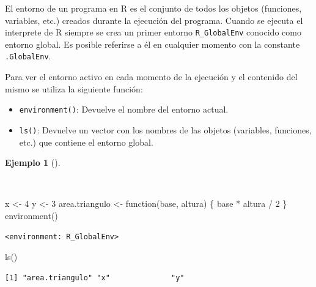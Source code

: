 \documentclass[
  a4paper,
]{scrreport}
\newenvironment{Shaded}{\begin{snugshade}}{\end{snugshade}}
\newcommand{\ControlFlowTok}[1]{\textcolor[rgb]{0.00,0.23,0.31}{#1}}
\newcommand{\DecValTok}[1]{\textcolor[rgb]{0.68,0.00,0.00}{#1}}
\newcommand{\FunctionTok}[1]{\textcolor[rgb]{0.28,0.35,0.67}{#1}}
\newcommand{\NormalTok}[1]{\textcolor[rgb]{0.00,0.23,0.31}{#1}}
\newcommand{\OtherTok}[1]{\textcolor[rgb]{0.00,0.23,0.31}{#1}}
\newcommand{\SpecialCharTok}[1]{\textcolor[rgb]{0.37,0.37,0.37}{#1}}
\providecommand{\tightlist}{%
  \setlength{\itemsep}{0pt}\setlength{\parskip}{0pt}}\usepackage{longtable,booktabs,array}
\theoremstyle{definition}
\theoremstyle{definition}
\newtheorem{example}{Ejemplo}[chapter]
\theoremstyle{remark}
\begin{document}
El entorno de un programa en R es el conjunto de todos los objetos
(funciones, variables, etc.) creados durante la ejecución del programa.
Cuando se ejecuta el interprete de R siempre se crea un primer entorno
\texttt{R\_GlobalEnv} conocido como entorno global. Es posible referirse
a él en cualquier momento con la constante \texttt{.GlobalEnv}.

Para ver el entorno activo en cada momento de la ejecución y el
contenido del mismo se utiliza la siguiente función:

\begin{itemize}
\tightlist
\item
  \texttt{environment()}: Devuelve el nombre del entorno actual.
\item
  \texttt{ls()}: Devuelve un vector con los nombres de las objetos
  (variables, funciones, etc.) que contiene el entorno global.
\end{itemize}

\begin{example}[]\protect\hypertarget{exm-acceso-entorno-global}{}\label{exm-acceso-entorno-global}

~

\begin{Shaded}
\begin{Highlighting}[]
\NormalTok{x }\OtherTok{\textless{}{-}} \DecValTok{4}
\NormalTok{y }\OtherTok{\textless{}{-}} \DecValTok{3}
\NormalTok{area.triangulo }\OtherTok{\textless{}{-}} \ControlFlowTok{function}\NormalTok{(base, altura) \{}
\NormalTok{  base }\SpecialCharTok{*}\NormalTok{ altura }\SpecialCharTok{/} \DecValTok{2}
\NormalTok{\}}
\FunctionTok{environment}\NormalTok{()}
\end{Highlighting}
\end{Shaded}

\begin{verbatim}
<environment: R_GlobalEnv>
\end{verbatim}

\begin{Shaded}
\begin{Highlighting}[]
\FunctionTok{ls}\NormalTok{()}
\end{Highlighting}
\end{Shaded}

\begin{verbatim}
[1] "area.triangulo" "x"              "y"             
\end{verbatim}

\end{example}
\end{document}
